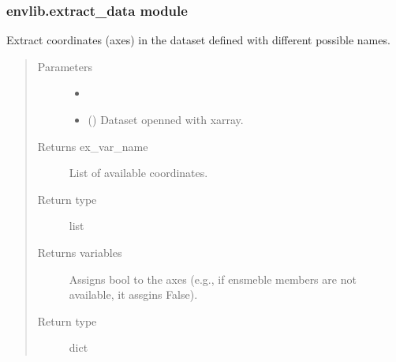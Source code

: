 \documentclass[a4paper,11pt,english]{sphinxmanual}
\begin{document}
\subsubsection{envlib.extract\_data module}
\label{\detokenize{envlib:module-envlib.extract_data}}\label{\detokenize{envlib:envlib-extract-data-module}}

\begin{fulllineitems}
\label{\detokenize{envlib:envlib.extract_data.extract_coordinates}}
\sphinxAtStartPar
Extract coordinates (axes) in the dataset defined with different possible names.
\begin{quote}\begin{description}
\item[{Parameters}] \leavevmode\begin{itemize}
\item {} 
\sphinxAtStartPar
{} \textendash{} 

\item {} 
\sphinxAtStartPar
{} () \textendash{} Dataset openned with xarray.

\end{itemize}

\item[{Returns ex\_var\_name}] \leavevmode
\sphinxAtStartPar
List of available coordinates.

\item[{Return type}] \leavevmode
\sphinxAtStartPar
list

\item[{Returns variables}] \leavevmode
\sphinxAtStartPar
Assigns bool to the axes (e.g., if ensmeble members are not available, it assgins False).

\item[{Return type}] \leavevmode
\sphinxAtStartPar
dict

\end{description}\end{quote}

\end{fulllineitems}
\end{document}
